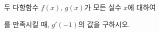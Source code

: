 두 다항함수 $f(x)$, $g(x)$가 모든 실수 $x$에 대하여 \par\smallskip{}\par\smallskip\noindent 를 만족시킬 때, $g'(-1)$의 값을 구하시오.
